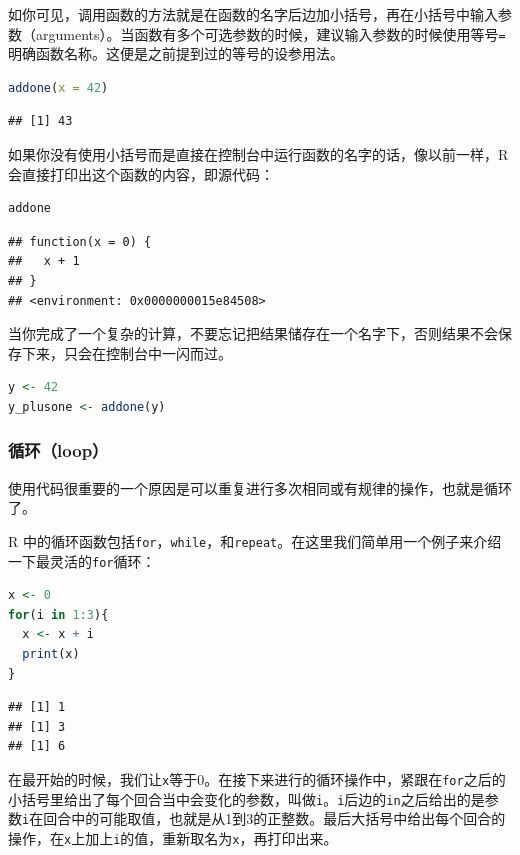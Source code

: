\documentclass[]{ctexbook}
\newcommand{\passthrough}[1]{#1}
\begin{document}
如你可见，调用函数的方法就是在函数的名字后边加小括号，再在小括号中输入参数（arguments）。当函数有多个可选参数的时候，建议输入参数的时候使用等号\passthrough{\lstinline!=!}明确函数名称。这便是之前提到过的等号的设参用法。

\begin{lstlisting}[language=R]
addone(x = 42)
\end{lstlisting}

\begin{lstlisting}
## [1] 43
\end{lstlisting}

如果你没有使用小括号而是直接在控制台中运行函数的名字的话，像以前一样，R会直接打印出这个函数的内容，即源代码：

\begin{lstlisting}[language=R]
addone
\end{lstlisting}

\begin{lstlisting}
## function(x = 0) {
##   x + 1
## }
## <environment: 0x0000000015e84508>
\end{lstlisting}

当你完成了一个复杂的计算，不要忘记把结果储存在一个名字下，否则结果不会保存下来，只会在控制台中一闪而过。

\begin{lstlisting}[language=R]
y <- 42
y_plusone <- addone(y)
\end{lstlisting}

\hypertarget{ux5faaux73afloop}{%
\subsubsection{循环（loop）}\label{ux5faaux73afloop}}

使用代码很重要的一个原因是可以重复进行多次相同或有规律的操作，也就是循环了。

R 中的循环函数包括\passthrough{\lstinline!for!}，\passthrough{\lstinline!while!}，和\passthrough{\lstinline!repeat!}。在这里我们简单用一个例子来介绍一下最灵活的\passthrough{\lstinline!for!}循环：

\begin{lstlisting}[language=R]
x <- 0
for(i in 1:3){
  x <- x + i
  print(x)
}
\end{lstlisting}

\begin{lstlisting}
## [1] 1
## [1] 3
## [1] 6
\end{lstlisting}

在最开始的时候，我们让\passthrough{\lstinline!x!}等于0。在接下来进行的循环操作中，紧跟在\passthrough{\lstinline!for!}之后的小括号里给出了每个回合当中会变化的参数，叫做\passthrough{\lstinline!i!}。\passthrough{\lstinline!i!}后边的\passthrough{\lstinline!in!}之后给出的是参数\passthrough{\lstinline!i!}在回合中的可能取值，也就是从1到3的正整数。最后大括号中给出每个回合的操作，在\passthrough{\lstinline!x!}上加上\passthrough{\lstinline!i!}的值，重新取名为\passthrough{\lstinline!x!}，再打印出来。
\end{document}
